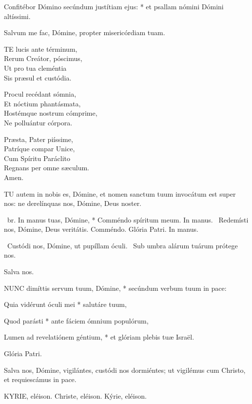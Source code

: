 Confitébor Dómino secúndum justítiam ejus: * et psallam nómini Dómini altíssimi.

 Salvum me fac, Dómine, propter misericórdiam tuam.


\lettrine[lines=2]{T}{E} lucis ante términum,\\
Rerum Creátor, póscimus,\\
Ut pro tua cleméntia\\
Sis præsul et custódia.

Procul recédant sómnia,\\
Et nóctium phantásmata,\\
Hostémque nostrum cómprime,\\
Ne polluántur córpora.

Præsta, Pater piíssime,\\
Patríque compar Unice,\\
Cum Spíritu Paráclito\\
Regnans per omne sæculum.\\
Amen.


\lettrine[lines=2]{T}{U} autem in nobis es, Dómine, et nomen sanctum tuum invocátum est super nos: ne derelínquas nos, Dómine, Deus noster.

\R\ br. In manus tuas, Dómine, * Comméndo spíritum meum. In manus. \V\ Redemísti nos, Dómine, Deus veritátis. Comméndo. Glória Patri. In manus.

\V\ Custódi nos, Dómine, ut pupíllam óculi. \R\ Sub umbra alárum tuárum prótege nos.

 Salva nos.


\lettrine[lines=2]{N}{UNC} dimíttis servum tuum, Dómine, * secúndum verbum tuum in pace:

Quia vidérunt óculi mei * salutáre tuum,

Quod parásti * ante fáciem ómnium populórum,

Lumen ad revelatiónem géntium, * et glóriam plebis tuæ Israël.

Glória Patri.

 Salva nos, Dómine, vigilántes, custódi nos dormiéntes; ut vigilémus cum Christo, et requiescámus in pace.


KYRIE, eléison. Christe, eléison. Kýrie, eléison.

